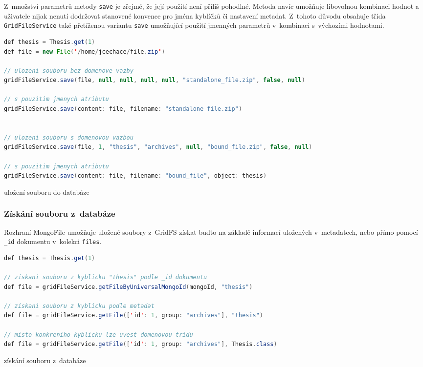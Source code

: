 Z~množství parametrů metody \texttt{save} je zřejmé, že její použití není příliš pohodlné. Metoda navíc umožňuje libovolnou kombinaci hodnot a uživatele nijak nenutí dodržovat stanovené konvence pro jména kyblíčků či nastavení metadat. Z~tohoto důvodu obsahuje třída \texttt{GridFileService} také přetíženou variantu \texttt{save} umožňující použití jmenných parametrů v~kombinaci s~výchozími hodnotami.

\begin{example}
\centering
\begin{lstlisting}[language=Java]
def thesis = Thesis.get(1)
def file = new File('/home/jcechace/file.zip')

// ulozeni souboru bez domenove vazby
gridFileService.save(file, null, null, null, null, "standalone_file.zip", false, null)

// s pouzitim jmenych atributu
gridFileService.save(content: file, filename: "standalone_file.zip")


// ulozeni souboru s domenovou vazbou
gridFileService.save(file, 1, "thesis", "archives", null, "bound_file.zip", false, null)

// s pouzitim jmenych atributu
gridFileService.save(content: file, filename: "bound_file", object: thesis)
\end{lstlisting}
\caption{uložení souboru do databáze}
\end{example}

\subsubsection{\textbf{Získání souboru z~databáze}}
Rozhraní MongoFile umožňuje uložené soubory z~GridFS získat buďto na základě informací uložených v~metadatech, nebo přímo pomocí \texttt{\_id} dokumentu v~kolekci \texttt{files}.

\begin{example}
\centering
\begin{lstlisting}[language=Java]
def thesis = Thesis.get(1)

// ziskani souboru z kyblicku "thesis" podle _id dokumentu
def file = gridFileService.getFileByUniversalMongoId(mongoId, "thesis")

// ziskani souboru z kyblicku podle metadat
def file = gridFileService.getFile(['id': 1, group: "archives"], "thesis")

// misto konkreniho kyblicku lze uvest domenovou tridu
def file = gridFileService.getFile(['id': 1, group: "archives"], Thesis.class)
\end{lstlisting}
\caption{získání souboru z~databáze}
\end{example}

